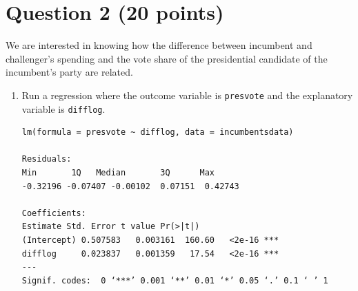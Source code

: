 \documentclass[12pt,letterpaper]{article}
\begin{document}
\section*{Question 2 (20 points)}
\noindent We are interested in knowing how the difference between incumbent and challenger's spending and the vote share of the presidential candidate of the incumbent's party are related.	\vspace{.25cm}
	\begin{enumerate}
		\item Run a regression where the outcome variable is \texttt{presvote} and the explanatory variable is \texttt{difflog}.
		
		\begin{Verbatim}
lm(formula = presvote ~ difflog, data = incumbentsdata)

Residuals:
Min       1Q   Median       3Q      Max 
-0.32196 -0.07407 -0.00102  0.07151  0.42743 

Coefficients:
Estimate Std. Error t value Pr(>|t|)    
(Intercept) 0.507583   0.003161  160.60   <2e-16 ***
difflog     0.023837   0.001359   17.54   <2e-16 ***
---
Signif. codes:  0 ‘***’ 0.001 ‘**’ 0.01 ‘*’ 0.05 ‘.’ 0.1 ‘ ’ 1


\end{Verbatim}
\end{enumerate}
\end{document}
